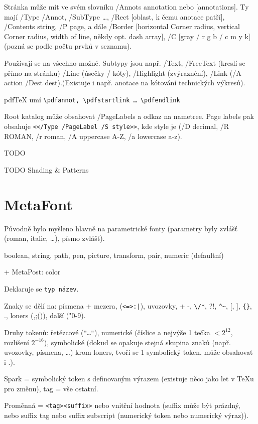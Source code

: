 \documentclass[12pt]{article}					%
\begin{document}
        \begin{definice}[Anotace]
            Stránka může mít ve svém slovníku /Annots annotation nebo [annotations]. Ty mají /Type /Annot, /SubType …, /Rect [oblast, k čemu anotace patří], /Contents string, /P page, a dále /Border [horizontal Corner radius, vertical Corner radius, width of line, někdy opt. dash array], /C [gray / r g b / c m y k] (pozná se podle počtu prvků v seznamu).

            Používají se na všechno možné. Subtypy jsou např. /Text, /FreeText (kreslí se přímo na stránku) /Line (úsečky / kóty), /Highlight (zvýraznění), /Link (/A action /Dest dest).(Existuje i např. anotace na kótování technických výkresů).

            pdfTeX umí \verb|\pdfannot, \pdfstartlink … \pdfendlink|
        \end{definice}

        \begin{definice}[PageLabels]
            Root katalog může obsahovat /PageLabels a odkaz na nametree. Page labels pak obsahuje \verb|<</Type /PageLabel /S style>>|, kde style je (/D decimal, /R ROMAN, /r roman, /A uppercase A-Z, /a lowercase a-z).

            TODO
        \end{definice}

        TODO Shading \& Patterns


\section{MetaFont}
    \begin{poznamka}
        Původně bylo myšleno hlavně na parametrické fonty (parametry byly zvlášť (roman, italic, …), písmo zvlášť).
    \end{poznamka}

    \begin{definice}
        boolean, string, path, pen, picture, transform, pair, numeric (defaultní)

        + MetaPost: color

        Deklaruje se \verb|typ název|.
    \end{definice}

    \begin{definice}
        Znaky se dělí na: písmena + mezera, (\verb&<=>:|&), uvozovky, + -, \verb|\/*|, ?!, \verb|^~|, [, ], \verb|{}|, ., loners (,;()), další ("0-9).

        Druhy tokenů: řetězcové (\verb|"…"|), numerické (číslice a nejvýše 1 tečka $<2^{12}$, rozlišení $2^{-16}$), symbolické (dokud se opakuje stejná skupina znaků (např. uvozovky, písmena, …) krom loners, tvoří se 1 symbolický token, může obsahovat i .).

        Spark = symbolický token s definovaným výrazem (existuje něco jako let v TeXu pro změnu),  tag = vše ostatní.

        Proměnná = \verb|<tag><suffix>| nebo vnitřní hodnota (suffix může být prázdný, nebo suffix tag nebo suffix subscript (numerický token nebo numerický výraz)).
    \end{definice}
\end{document}
